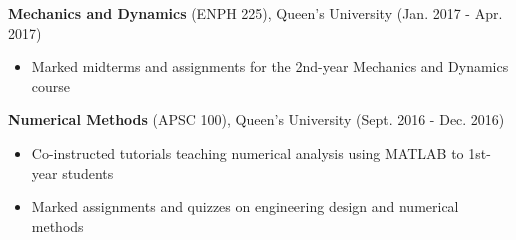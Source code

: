 \documentclass[11pt,letterpaper]{article}
\begin{document}
\textbf{Mechanics and Dynamics} (ENPH 225), Queen's University \hfill (Jan. 2017 - Apr. 2017)
	\vspace{-0.25cm}
\begin{itemize}
	\item Marked midterms and assignments for the 2nd-year Mechanics and Dynamics course
\end{itemize}
	\vspace{-0.25cm}
\textbf{Numerical Methods} (APSC 100), Queen's University \hfill (Sept. 2016 - Dec. 2016)
	\vspace{-0.25cm}
\begin{itemize}
	\item Co-instructed tutorials teaching numerical analysis using MATLAB to 1st-year students
	\vspace{-0.25cm}
	\item Marked assignments and quizzes on engineering design and numerical methods
\end{itemize}
\end{document}

